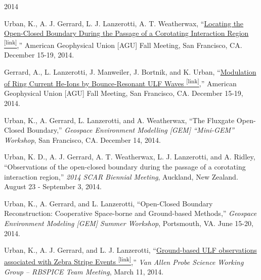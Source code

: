 \vspace{0.2cm}


\begin{center} \Large{2014} \end{center}
\normalsize
\begin{itemize*}
  \item
    Urban, K., A. J. Gerrard, L. J. Lanzerotti, A. T. Weatherwax,
    ``\href{http://adsabs.harvard.edu/abs/2014AGUFMSA13B3992U}{Locating
    the Open-Closed Boundary During the Passage of a Corotating
    Interaction Region \textsuperscript{\tiny{[link]}}},'' American Geophysical Union [AGU]  Fall
    Meeting, San Francisco, CA. December 15-19, 2014.

  \item 
    Gerrard, A., L. Lanzerotti, J. Manweiler, J. Bortnik, and K. Urban,
    ``\href{https://scholar.google.com/citations?view_op=view_citation&hl=en&user=KTLuoQkAAAAJ&citation_for_view=KTLuoQkAAAAJ:0EnyYjriUFMC}{Modulation
    of Ring Current He-Ions by Bounce-Resonant ULF Waves \textsuperscript{\tiny{[link]}}},'' 
    American Geophysical Union [AGU] Fall Meeting, San Francisco, CA.
    December 15-19, 2014.

  \item Urban, K., A. Gerrard, L. Lanzerotti, and A. Weatherwax, ``The
    Fluxgate Open-Closed Boundary,'' {\em Geospace Environment Modelling
    [GEM] ``Mini-GEM'' Workshop}, San Francisco, CA. December 14, 2014.

  \item Urban, K. D., A. J. Gerrard, A. T. Weatherwax, L. J.
    Lanzerotti, and A. Ridley, ``Observations of the open-closed
    boundary during the passage of a corotating interaction
    region,'' {\em 2014 SCAR Biennial Meeting}, Auckland, New
    Zealand. August 23 - September 3, 2014.

  \item 
  Urban, K., A. Gerrard, and L. Lanzerotti, ``Open-Closed Boundary
  Reconstruction: Cooperative Space-borne and Ground-based Methods,''
  {\em Geospace Environment Modeling [GEM] Summer Workshop},
    Portsmouth, VA. June 15-20, 2014.

  \item
    Urban, K., A. J. Gerrard, and L. J. Lanzerotti,
    ``\href{http://rbspgway.jhuapl.edu/rbsp_SWG_Mar_2014}{Ground-based ULF
    observations associated with Zebra Stripe Events \textsuperscript{\tiny{[link]}}},'' {\em Van
    Allen Probe Science Working Group -- RBSPICE Team Meeting}, March 11,
    2014.

\end{itemize*}


